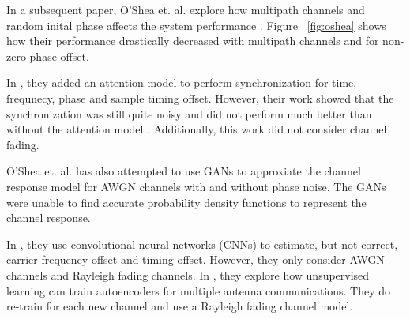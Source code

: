 In a subsequent paper, O'Shea et. al. explore how multipath channels and random inital phase affects the system performance \cite{osheaatt}.  Figure ~\ref{fig:oshea} shows how their performance drastically decreased with multipath channels and for non-zero phase offset.

In \cite{osheasynch}, they added an attention model to perform synchronization for time, frequnecy, phase and sample timing offset.  However, their work showed that the synchronization was still quite noisy and did not perform much better than without the attention model \cite{osheaatt}.  Additionally, this work did not consider channel fading. 

O'Shea et. al. has also attempted to use GANs to approxiate the channel response model for AWGN channels with and without phase noise\cite{osheavoid}.  The GANs were unable to find accurate probability density functions to represent the channel response.  

In \cite{osheacsi}, they use convolutional neural networks (CNNs) to estimate, but not correct, carrier frequency offset and timing offset.  However, they only consider AWGN channels and Rayleigh fading channels.  
In \cite{osheamimo}, they explore how unsupervised learning can train autoencoders for multiple antenna communications.  They do re-train for each new channel and use a Rayleigh fading channel model.